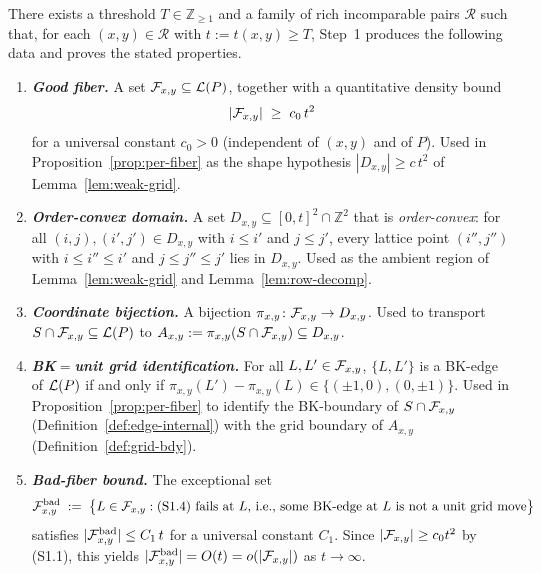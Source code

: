 \begin{definition}\label{def:step1-data}
There exists a threshold $T\in\mathbb{Z}_{\ge 1}$ and a family of rich incomparable
pairs $\mathcal{R}$ such that, for each $(x,y)\in\mathcal{R}$ with $t:=t(x,y)\ge T$,
Step~1 produces the following data and proves the stated properties.
\begin{enumerate}[label=\textup{(S1.\arabic*)}, leftmargin=*]
    \item \emph{\textbf{Good fiber.}} A set $\mathcal{F}_{x,y}\subseteq\mathcal{L}(P)$, together
          with a quantitative density bound
          \[
            |\mathcal{F}_{x,y}| \;\ge\; c_0\,t^2
          \]
          for a universal constant $c_0>0$ (independent of $(x,y)$ and of $P$). Used
          in Proposition~\ref{prop:per-fiber} as the shape hypothesis
          $|D_{x,y}|\ge c\,t^2$ of Lemma~\ref{lem:weak-grid}.
    \item \emph{\textbf{Order-convex domain.}} A set $D_{x,y}\subseteq[0,t]^2\cap\mathbb{Z}^2$
          that is \emph{order-convex}: for all $(i,j),(i',j')\in D_{x,y}$ with
          $i\le i'$ and $j\le j'$, every lattice point $(i'',j'')$ with
          $i\le i''\le i'$ and $j\le j''\le j'$ lies in $D_{x,y}$. Used as the
          ambient region of Lemma~\ref{lem:weak-grid} and Lemma~\ref{lem:row-decomp}.
    \item \emph{\textbf{Coordinate bijection.}} A bijection
          $\pi_{x,y}\colon\mathcal{F}_{x,y}\to D_{x,y}$. Used to transport
          $S\cap\mathcal{F}_{x,y}\subseteq\mathcal{L}(P)$ to $A_{x,y}:=\pi_{x,y}(S\cap\mathcal{F}_{x,y})
          \subseteq D_{x,y}$.
    \item \emph{\textbf{BK$=$unit grid identification.}} For all
          $L,L'\in\mathcal{F}_{x,y}$, $\{L,L'\}$ is a BK-edge of $\mathcal{L}(P)$ if and only if
          $\pi_{x,y}(L')-\pi_{x,y}(L)\in\{(\pm 1,0),(0,\pm 1)\}$. Used in
          Proposition~\ref{prop:per-fiber} to identify the BK-boundary of
          $S\cap\mathcal{F}_{x,y}$ (Definition~\ref{def:edge-internal}) with the grid
          boundary of $A_{x,y}$ (Definition~\ref{def:grid-bdy}).
    \item \emph{\textbf{Bad-fiber bound.}} The exceptional set
          \[
            \mathcal{F}_{x,y}^{\mathrm{bad}} \;:=\; \bigl\{L\in\mathcal{F}_{x,y} :
                   \text{(S1.4) fails at $L$, i.e., some BK-edge at $L$ is not a unit grid move}\bigr\}
          \]
          satisfies $|\mathcal{F}_{x,y}^{\mathrm{bad}}|\le C_1\,t$ for a universal
          constant $C_1$. Since $|\mathcal{F}_{x,y}|\ge c_0 t^2$ by (S1.1), this yields
          $|\mathcal{F}_{x,y}^{\mathrm{bad}}|=O(t)=o(|\mathcal{F}_{x,y}|)$ as $t\to\infty$.

\end{enumerate}
\end{definition}
